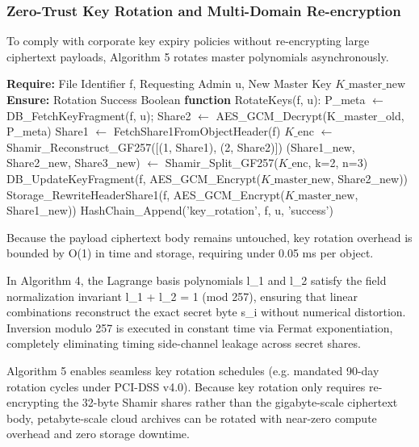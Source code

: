 \documentclass[5p,times]{elsarticle}
\begin{document}
\subsubsection{Zero-Trust Key Rotation and Multi-Domain Re-encryption}

To comply with corporate key expiry policies without re-encrypting large ciphertext payloads, Algorithm 5 rotates master polynomials asynchronously.

\begin{algorithm}[!ht]
\caption{Zero-Trust Key Rotation and Multi-Domain Re-encryption Protocol}
\begin{algorithmic}[1]
  \STATE \textbf{Require:} File Identifier f, Requesting Admin u, New Master Key $K\_{\text{master\_new}}$
  \STATE \textbf{Ensure:} Rotation Success Boolean
  \STATE \textbf{function} RotateKeys(f, u):
  \STATE P\_meta $\leftarrow$ DB\_FetchKeyFragment(f, u); Share2 $\leftarrow$ AES\_GCM\_Decrypt(K\_master\_old, P\_meta)
  \STATE Share1 $\leftarrow$ FetchShare1FromObjectHeader(f)
  \STATE $K\_{\text{enc}}$ $\leftarrow$ Shamir\_Reconstruct\_GF257([(1, Share1), (2, Share2)])
  \STATE (Share1\_new, Share2\_new, Share3\_new) $\leftarrow$ Shamir\_Split\_GF257($K\_{\text{enc}}$, k=2, n=3)
  \STATE DB\_UpdateKeyFragment(f, AES\_GCM\_Encrypt($K\_{\text{master\_new}}$, Share2\_new))
  \STATE Storage\_RewriteHeaderShare1(f, AES\_GCM\_Encrypt($K\_{\text{master\_new}}$, Share1\_new))
  \STATE HashChain\_Append('key\_rotation', f, u, 'success')
\end{algorithmic}
\end{algorithm}

Because the payload ciphertext body remains untouched, key rotation overhead is bounded by O(1) in time and storage, requiring under 0.05 ms per object.

In Algorithm 4, the Lagrange basis polynomials l\_1 and l\_2 satisfy the field normalization invariant l\_1 + l\_2 = 1 (mod 257), ensuring that linear combinations reconstruct the exact secret byte s\_i without numerical distortion. Inversion modulo 257 is executed in constant time via Fermat exponentiation, completely eliminating timing side-channel leakage across secret shares.

Algorithm 5 enables seamless key rotation schedules (e.g. mandated 90-day rotation cycles under PCI-DSS v4.0). Because key rotation only requires re-encrypting the 32-byte Shamir shares rather than the gigabyte-scale ciphertext body, petabyte-scale cloud archives can be rotated with near-zero compute overhead and zero storage downtime.
\end{document}
